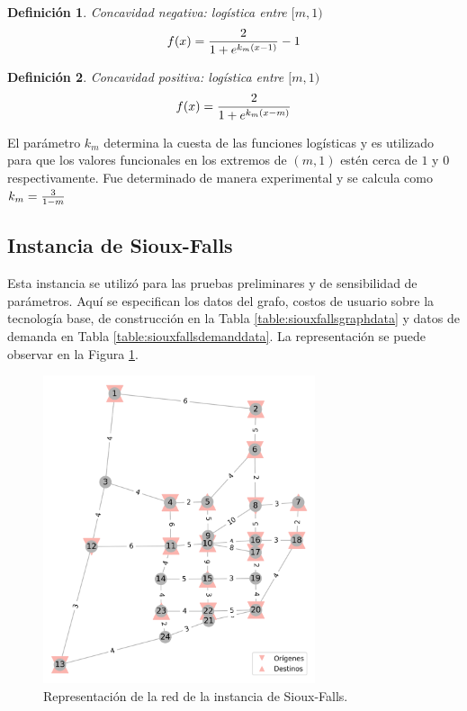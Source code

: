 \documentclass{article}
\newtheorem{definition}{Definición}
\begin{document}
  \begin{definition}
    Concavidad negativa: logística entre $[m, 1)$
    \begin{align}
        f(x) = {2 \over 1 + e^{k_m(x - 1)}} - 1
    \end{align}
  \end{definition}

  \begin{definition}
    Concavidad positiva: logística entre $[m, 1)$
    \begin{align}
        f(x) = {2 \over 1 + e^{k_m(x - m)}}
    \end{align}
  \end{definition}

  El parámetro $k_m$ determina la cuesta de las funciones logísticas y es utilizado para que los valores funcionales en los extremos de $(m, 1)$ estén cerca de $1$ y $0$ respectivamente. Fue determinado de manera experimental y se calcula como $k_m = {3 \over 1 - m}$

  \subsection{Instancia de Sioux-Falls}
  \label{sect:siouxfallsdata}

  Esta instancia se utilizó para las pruebas preliminares y de sensibilidad de parámetros. Aquí se especifican los datos del grafo, costos de usuario sobre la tecnología base, de construcción en la Tabla \ref{table:siouxfallsgraphdata} y datos de demanda en Tabla \ref{table:siouxfallsdemanddata}. La representación se puede observar en la Figura \ref{fig:siouxfallsapendix}.

  \begin{figure}[h!]
    \centering
    \includegraphics[width=8cm]{../resources/sioux_falls_odpairs.png}
    \caption{Representación de la red de la instancia de Sioux-Falls.}
    \label{fig:siouxfallsapendix}
  \end{figure}
\end{document}
